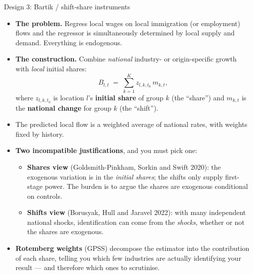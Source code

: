 \documentclass[
  11pt,
  ignorenonframetext,
  aspectratio=169,
]{beamer}
\providecommand{\tightlist}{%
  \setlength{\itemsep}{0pt}\setlength{\parskip}{0pt}}
\begin{document}
\begin{frame}{Design 3: Bartik / shift-share instruments}
\protect{}\label{design-3-bartik-shift-share-instruments}
\begin{itemize}
\tightlist
\item
  \textbf{The problem.} Regress local wages on local immigration (or
  employment) flows and the regressor is simultaneously determined by
  local supply and demand. Everything is endogenous.
\item
  \textbf{The construction.} Combine \emph{national} industry- or
  origin-specific growth with \emph{local} initial shares: \[
  B_{l,t} \;=\; \sum_{k=1}^{K} z_{l,k,t_0}\, m_{k,t},
  \] where \(z_{l,k,t_0}\) is location \(l\)'s \textbf{initial share} of
  group \(k\) (the ``share'') and \(m_{k,t}\) is the \textbf{national
  change} for group \(k\) (the ``shift'').
\item
  The predicted local flow is a weighted average of national rates, with
  weights fixed by history.
\item
  \textbf{Two incompatible justifications}, and you must pick one:

  \begin{itemize}
  \tightlist
  \item
    \textbf{Shares view} (Goldsmith-Pinkham, Sorkin and Swift 2020): the
    exogenous variation is in the \emph{initial shares}; the shifts only
    supply first-stage power. The burden is to argue the shares are
    exogenous conditional on controls.
  \item
    \textbf{Shifts view} (Borusyak, Hull and Jaravel 2022): with many
    independent national shocks, identification can come from the
    \emph{shocks}, whether or not the shares are exogenous.
  \end{itemize}
\item
  \textbf{Rotemberg weights} (GPSS) decompose the estimator into the
  contribution of each share, telling you which few industries are
  actually identifying your result --- and therefore which ones to
  scrutinise.
\end{itemize}
\end{frame}
\end{document}
